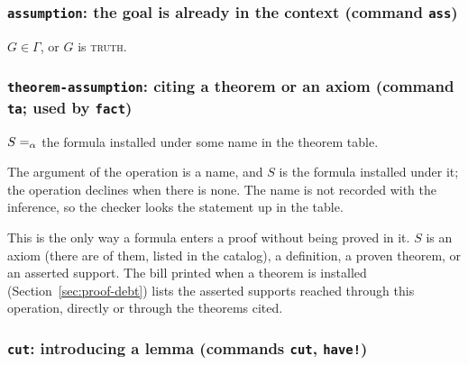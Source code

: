 \subsubsection*{\texttt{assumption}: the goal is already in the context
  (command \texttt{ass})}

\label{kop:assumption}%
\begin{VNBcond}
\item[Assumption] $G \in \Gamma$, or $G$ is \textsc{truth}.
\end{VNBcond}

\subsubsection*{\texttt{theorem-assumption}: citing a theorem or an axiom
  (command \texttt{ta}; used by \texttt{fact})}

\label{kop:theorem-assumption}%
\begin{VNBcond}
\item[Installed] $S =_{\alpha}$ the formula installed under some name in the
  theorem table.
\end{VNBcond}
The argument of the operation is a name, and $S$ is the formula installed
under it; the operation declines when there is none.  The name is not
recorded with the inference, so the checker looks the statement up in
the table.

This is the only way a formula enters a proof without being proved in
it.  $S$ is an axiom (there are \VNBaxiomcount{} of them, listed in the
catalog), a definition, a proven theorem, or an asserted support.  The
bill printed when a theorem is installed
(Section~\ref{sec:proof-debt}) lists the asserted supports reached
through this operation, directly or through the theorems cited.

\subsubsection*{\texttt{cut}: introducing a lemma (commands \texttt{cut},
  \texttt{have!})}

\label{kop:cut}%

